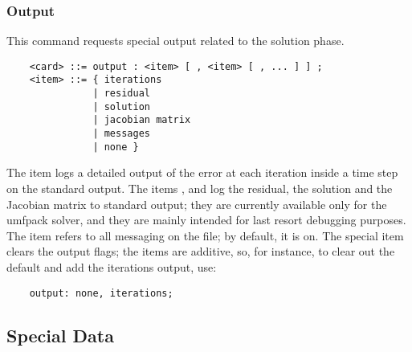 \subsubsection{Output}
This command requests special output related to the solution phase.
\begin{verbatim}
    <card> ::= output : <item> [ , <item> [ , ... ] ] ;
    <item> ::= { iterations
               | residual
               | solution
               | jacobian matrix
               | messages
               | none }
\end{verbatim}
The item  logs a detailed output of the error
at each iteration inside a time step 
on the standard output.
The items ,  and  log
the residual, the solution and the Jacobian matrix to standard output;
they are currently available only for the umfpack solver, and they are
mainly intended for last resort debugging purposes.
The item  refers to all messaging 
on the  file; by default, it is on.
The special item  clears the output flags; the items
are additive, so, for instance, to clear out the default 
and add the iterations output, use:
\begin{verbatim}
    output: none, iterations;
\end{verbatim}

\subsection{Special Data}
